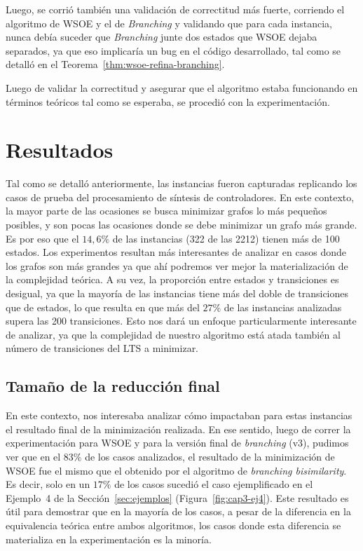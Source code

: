 Luego, se corrió también una validación de correctitud más fuerte, corriendo el algoritmo de WSOE y el de \textit{Branching} y validando que para cada instancia, nunca debía suceder que \textit{Branching} junte dos estados que WSOE dejaba separados, ya que eso implicaría un bug en el código desarrollado, tal como se detalló en el Teorema~\ref{thm:wsoe-refina-branching}.

Luego de validar la correctitud y asegurar que el algoritmo estaba funcionando en términos teóricos tal como se esperaba, se procedió con la experimentación.

\section{Resultados}

Tal como se detalló anteriormente, las instancias fueron capturadas replicando los casos de prueba del procesamiento de síntesis de controladores. En este contexto, la mayor parte de las ocasiones se busca minimizar grafos lo más pequeños posibles, y son pocas las ocasiones donde se debe minimizar un grafo más grande. Es por eso que el $14,6\%$ de las instancias (322 de las 2212) tienen más de 100 estados. Los experimentos resultan más interesantes de analizar en casos donde los grafos son más grandes ya que ahí podremos ver mejor la materialización de la complejidad teórica. A su vez, la proporción entre estados y transiciones es desigual, ya que la mayoría de las instancias tiene más del doble de transiciones que de estados, lo que resulta en que más del $27\%$ de las instancias analizadas supera las 200 transiciones. Esto nos dará un enfoque particularmente interesante de analizar, ya que la complejidad de nuestro algoritmo está atada también al número de transiciones del LTS a minimizar.


\subsection{Tamaño de la reducción final}

En este contexto, nos interesaba analizar cómo impactaban para estas instancias el resultado final de la minimización realizada. En ese sentido, luego de correr la experimentación para WSOE y para la versión final de \textit{branching} (v3), pudimos ver que en el $83\%$ de los casos analizados, el resultado de la minimización de WSOE fue el mismo que el obtenido por el algoritmo de \textit{branching bisimilarity}. Es decir, solo en un $17\%$ de los casos sucedió el caso ejemplificado en el Ejemplo~4 de la Sección~\ref{sec:ejemplos} (Figura~\ref{fig:cap3-ej4}). Este resultado es útil para demostrar que en la mayoría de los casos, a pesar de la diferencia en la equivalencia teórica entre ambos algoritmos, los casos donde esta diferencia se materializa en la experimentación es la minoría.


